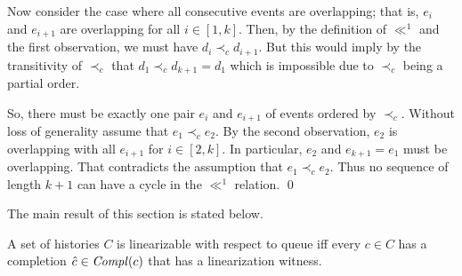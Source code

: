 \documentclass{LMCS}
\newcommand{\Compl}[1]{\ensuremath{\mathit{Compl}({#1})}}
\newcommand{\compl}{\ensuremath{\hat}}
\newcommand\mylabel[1]{\label{#1}}
\begin{document}
Now consider the case where all consecutive events are overlapping; that is, $e_i$ and $e_{i+1}$ are overlapping for all $i\in[1,k]$.
Then, by the definition of $\ll^1$ and the first observation, we must have $d_i\prec_c d_{i+1}$.
But this would imply by the transitivity of $\prec_c$ that $d_1\prec_c d_{k+1}=d_1$ which is impossible due to $\prec_c$ being a partial order.

So, there must be exactly one pair $e_i$ and $e_{i+1}$ of events ordered by $\prec_c$.
Without loss of generality assume that $e_1\prec_c e_2$.
By the second observation, $e_2$ is overlapping with all $e_{i+1}$ for $i\in[2,k]$.
In particular, $e_2$ and $e_{k+1}=e_1$ must be overlapping.
That contradicts the assumption that $e_1\prec_c e_2$. 
Thus no sequence of length $k+1$ can have a cycle in the $\ll^1$ relation.
\qed


The main result of this section is stated below.
\begin{thm}\mylabel{thm:witness}
A set of histories $C$ is linearizable with respect to queue iff every $c \in C$ has a completion
$\compl c \in \Compl c$ that has a linearization witness.
\end{thm}
\newpage

\proof\hfill
\end{document}
